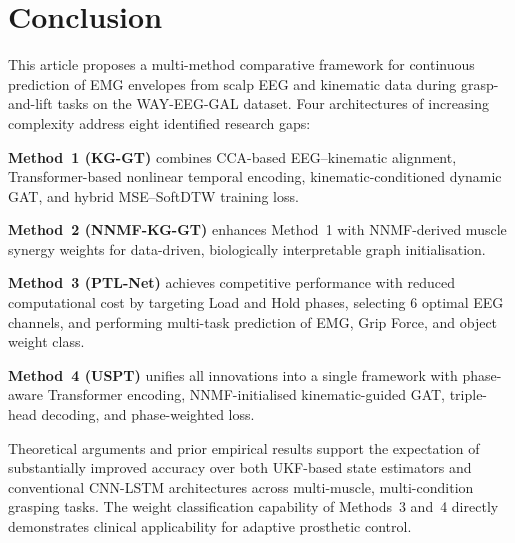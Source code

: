 \documentclass[12pt, a4paper]{article}
\begin{document}
	\section{Conclusion}
	
	This article proposes a multi-method comparative framework for continuous
	prediction of EMG envelopes from scalp EEG and kinematic data during
	grasp-and-lift tasks on the WAY-EEG-GAL dataset. Four architectures of
	increasing complexity address eight identified research gaps:
	
	\textbf{Method~1 (KG-GT)} combines CCA-based EEG--kinematic alignment,
	Transformer-based nonlinear temporal encoding, kinematic-conditioned dynamic
	GAT, and hybrid MSE--SoftDTW training loss.
	
	\textbf{Method~2 (NNMF-KG-GT)} enhances Method~1 with NNMF-derived muscle
	synergy weights for data-driven, biologically interpretable graph
	initialisation.
	
	\textbf{Method~3 (PTL-Net)} achieves competitive performance with reduced
	computational cost by targeting Load and Hold phases, selecting 6 optimal
	EEG channels, and performing multi-task prediction of EMG, Grip Force, and
	object weight class.
	
	\textbf{Method~4 (USPT)} unifies all innovations into a single framework
	with phase-aware Transformer encoding, NNMF-initialised kinematic-guided
	GAT, triple-head decoding, and phase-weighted loss.
	
	Theoretical arguments and prior empirical results support the expectation
	of substantially improved accuracy over both UKF-based state estimators and
	conventional CNN-LSTM architectures across multi-muscle, multi-condition
	grasping tasks. The weight classification capability of Methods~3 and~4
	directly demonstrates clinical applicability for adaptive prosthetic control.
	
\end{document}
